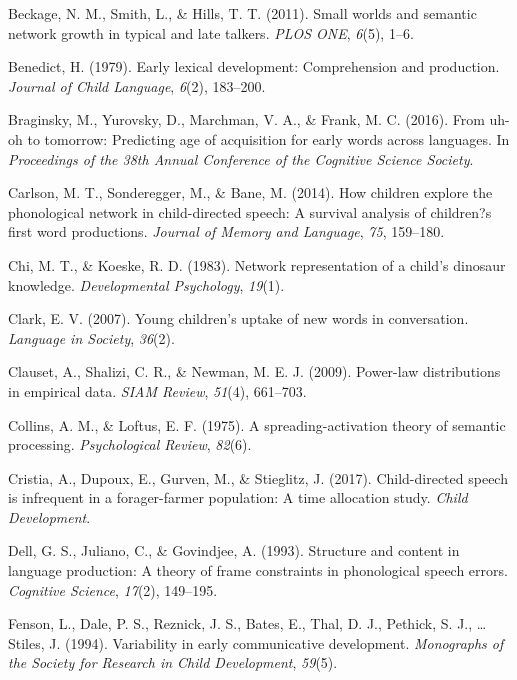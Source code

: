 \documentclass[english,floatsintext,man]{apa6}
\theoremstyle{definition}
\theoremstyle{definition}
\theoremstyle{definition}
\theoremstyle{remark}
\begin{document}
\hypertarget{ref-beckage2011}{}
Beckage, N. M., Smith, L., \& Hills, T. T. (2011). Small worlds and
semantic network growth in typical and late talkers. \emph{PLOS ONE},
\emph{6}(5), 1--6.

\hypertarget{ref-benedict1979}{}
Benedict, H. (1979). Early lexical development: Comprehension and
production. \emph{Journal of Child Language}, \emph{6}(2), 183--200.

\hypertarget{ref-braginsky2016}{}
Braginsky, M., Yurovsky, D., Marchman, V. A., \& Frank, M. C. (2016).
From uh-oh to tomorrow: Predicting age of acquisition for early words
across languages. In \emph{Proceedings of the 38th Annual Conference of
the Cognitive Science Society}.

\hypertarget{ref-carlson2014}{}
Carlson, M. T., Sonderegger, M., \& Bane, M. (2014). How children
explore the phonological network in child-directed speech: A survival
analysis of children?s first word productions. \emph{Journal of Memory
and Language}, \emph{75}, 159--180.

\hypertarget{ref-chi1983}{}
Chi, M. T., \& Koeske, R. D. (1983). Network representation of a child's
dinosaur knowledge. \emph{Developmental Psychology}, \emph{19}(1).

\hypertarget{ref-clark2007}{}
Clark, E. V. (2007). Young children's uptake of new words in
conversation. \emph{Language in Society}, \emph{36}(2).

\hypertarget{ref-clauset09}{}
Clauset, A., Shalizi, C. R., \& Newman, M. E. J. (2009). Power-law
distributions in empirical data. \emph{SIAM Review}, \emph{51}(4),
661--703.

\hypertarget{ref-collins1975}{}
Collins, A. M., \& Loftus, E. F. (1975). A spreading-activation theory
of semantic processing. \emph{Psychological Review}, \emph{82}(6).

\hypertarget{ref-cristia2017}{}
Cristia, A., Dupoux, E., Gurven, M., \& Stieglitz, J. (2017).
Child-directed speech is infrequent in a forager-farmer population: A
time allocation study. \emph{Child Development}.

\hypertarget{ref-dell1993}{}
Dell, G. S., Juliano, C., \& Govindjee, A. (1993). Structure and content
in language production: A theory of frame constraints in phonological
speech errors. \emph{Cognitive Science}, \emph{17}(2), 149--195.

\hypertarget{ref-fenson94}{}
Fenson, L., Dale, P. S., Reznick, J. S., Bates, E., Thal, D. J.,
Pethick, S. J., \ldots{} Stiles, J. (1994). Variability in early
communicative development. \emph{Monographs of the Society for Research
in Child Development}, \emph{59}(5).
\end{document}
